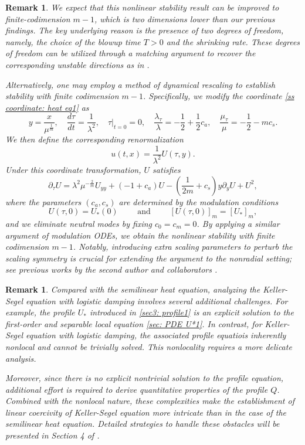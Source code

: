 \documentclass[12pt]{caltech_thesis}
\newtheorem{remark}[theorem]{Remark}
\numberwithin{equation}{section}
\begin{document}
\begin{remark}
    We expect that this nonlinear stability result can be improved to finite-codimension $m-1$, which is two dimensions lower than our previous findings. 
    The key underlying reason is the presence of two degrees of freedom, namely, the choice of the blowup time $T>0$ and the shrinking rate. These degrees of freedom can be utilized through a matching argument to recover the corresponding unstable directions as in \cite{Limodestability, lizhou2025nonradial}.
    
   
    Alternatively, one may employ a method of dynamical rescaling to establish stability with finite codimension $m-1$. 
    Specifically, we modify the coordinate \eqref{ss coordinate: heat eq1} as
    \[
    y = \frac{x}{\mu^\frac{1}{m}}, \quad  \frac{d\tau}{dt} = \frac{1}{\lambda^2}, \quad \tau\big|_{t=0}=0, \quad \frac{\lambda_\tau}{\lambda} = -\frac{1}{2} + \frac{1}{2} c_a, \quad \frac{\mu_\tau}{ \mu} = - \frac{1}{2}  - mc_s.
    \]
    We then define the corresponding renormalization
    \[
    u(t,x) = \frac{1}{\lambda^2} U (\tau,y).
    \]
    Under this coordinate transformation, $U$ satisfies
    \[
    \partial_\tau U = \lambda^2 \mu^{-\frac{2}{m}} U_{yy} + \left( -1 + c_a \right) U -\left( \frac{1}{2m} + c_s \right) y \partial_y U + U^2,
    \]
    where the parameters $(c_a,c_s)$ are determined by the modulation conditions
    \[
    U(\tau, 0) = U_*(0) \qquad \text{ and } \qquad  [U(\tau,0)]_{m}= [U_*]_{m},
    \] 
    and we eliminate neutral modes by fixing $c_0=c_m=0$.
    By applying a similar argument of modulation ODEs, we obtain the nonlinear stability with finite codimension $m-1$. Notably, introducing extra scaling parameters to perturb the scaling symmetry is crucial for extending the argument to the nonradial setting; see previous works by the second author and collaborators \cite{chen2024stability,hou20242}.
\end{remark}

\begin{remark}

Compared with the semilinear heat equation, analyzing the Keller-Segel equation with logistic damping involves several additional challenges. For example, 
the profile $U_*$ 
introduced in \eqref{sec3: profile1} is an explicit solution to 
the first-order and separable local equation \eqref{sec: PDE U*1}. 
In contrast, for Keller-Segel equation with logistic damping, the associated profile equatiois inherently nonlocal and cannot be trivially solved. 
This nonlocality requires a more delicate analysis.

    
    Moreover, since there is no explicit nontrivial solution to the profile equation, additional effort is required to derive quantitative properties of the profile $Q$. Combined with the nonlocal nature, these complexities make the establishment of linear coercivity of Keller-Segel equation more intricate than in the case of the semilinear heat equation.  Detailed strategies to handle these obstacles will be presented in Section 4 of \cite{liu2025finite}.
    
    
    
\end{remark}
\end{document}
